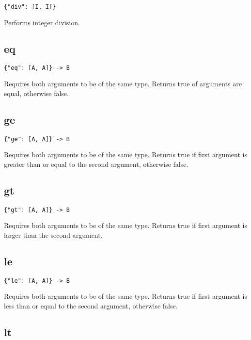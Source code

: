 \documentclass[12pt]{article}
\begin{document}
\begin{verbatim}
{"div": [I, I]}
\end{verbatim}

Performs integer division.

\subsection{eq}

\begin{verbatim}
{"eq": [A, A]} -> B
\end{verbatim}

Requires both arguments to be of the same type. Returns true of arguments are equal, otherwise false.

\subsection{ge}

\begin{verbatim}
{"ge": [A, A]} -> B
\end{verbatim}

Requires both arguments to be of the same type. Returns true if first argument is greater than or equal to the second argument, otherwise false.

\subsection{gt}

\begin{verbatim}
{"gt": [A, A]} -> B
\end{verbatim}

Requires both arguments to be of the same type. Returns true if first argument is larger than the second argument. 

\subsection{le}

\begin{verbatim}
{"le": [A, A]} -> B
\end{verbatim}

Requires both arguments to be of the same type. Returns true if first argument is less than or equal to the second argument, otherwise false.

\subsection{lt}
\end{document}
